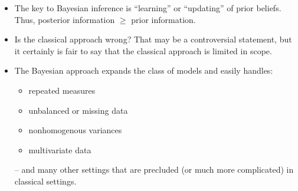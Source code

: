 \begin{frame}

\begin{itemize}\setlength{\itemsep}{0.5cm}
 \item The key to Bayesian inference is ``learning'' or ``updating'' of prior beliefs. Thus, posterior information $\geq$ prior information.

 \item Is the classical approach wrong? That may be a controversial statement, but it certainly is fair to say that the classical approach is limited in scope.

 \item The Bayesian approach expands the class of models and easily handles:
	\begin{itemize}
	\item repeated measures
	\item unbalanced or missing data
	\item nonhomogenous variances
	\item multivariate data
	\end{itemize}	
	-- and many other settings that are precluded (or much more complicated) in classical settings.
\end{itemize}

\end{frame}
